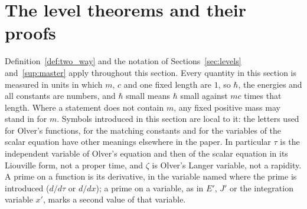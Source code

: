 \documentclass[aps,prd,onecolumn,tightenlines,nofootinbib,notitlepage,11pt,floatfix]{revtex4-2}
\theoremstyle{indentedtheorem}
\begin{document}
\section{The level theorems and their proofs}
\label{sup:levels_proofs}

Definition~\ref{def:two_way} and the notation of Sections~\ref{sec:levels} and~\ref{sup:master} apply throughout this section. Every quantity in this section is measured in units in which $m$, $c$ and one fixed length are $1$, so $\hbar$, the energies and all constants are numbers, and $\hbar$ small means $\hbar$ small against $mc$ times that length. Where a statement does not contain $m$, any fixed positive mass may stand in for $m$. Symbols introduced in this section are local to it: the letters used for Olver's functions, for the matching constants and for the variables of the scalar equation have other meanings elsewhere in the paper. In particular $\tau$ is the independent variable of Olver's equation and then of the scalar equation in its Liouville form, not a proper time, and $\zeta$ is Olver's Langer variable, not a rapidity. A prime on a function is its derivative, in the variable named where the prime is introduced ($d/d\tau$ or $d/dx$); a prime on a variable, as in $E'$, $J'$ or the integration variable $x'$, marks a second value of that variable.
\end{document}
